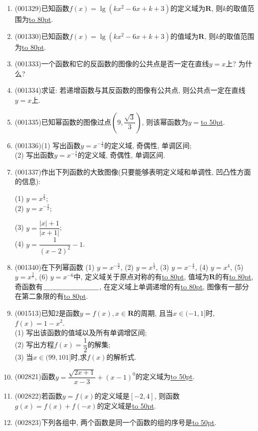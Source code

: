 \documentclass[10pt,a4paper]{article}
\newcommand{\blank}[1]{\underline{\hbox to #1pt{}}}
\begin{document}
\begin{enumerate}[1.]
\item {\tiny (001329)}已知函数$f(x)=\lg(kx^2-6x+k+3)$的定义域为$\mathbf{R}$, 则$k$的取值范围为\blank{80}.
\item {\tiny (001330)}已知函数$f(x)=\lg(kx^2-6x+k+3)$的值域为$\mathbf{R}$, 则$k$的取值范围为\blank{80}.
\item {\tiny (001333)}一个函数和它的反函数的图像的公共点是否一定在直线$y=x$上? 为什么?
\item {\tiny (001334)}求证: 若递增函数与其反函数的图像有公共点, 则公共点一定在直线$y=x$上.
\item {\tiny (001335)}已知幂函数的图像过点$(9,\dfrac{\sqrt{3}}{3})$, 则该幂函数为$y=$\blank{50}.
\item {\tiny (001336)}(1) 写出函数$y=x^{-\frac{4}{3}}$的定义域, 奇偶性, 单调区间;\\ 
(2) 写出函数$y=x^{-\frac{3}{4}}$的定义域, 奇偶性, 单调区间.
\item {\tiny (001337)}作出下列函数的大致图像(只要能够表明定义域和单调性, 凹凸性方面的信息):\\ 
\begin{multicols}{2}
(1) $y=x^{\frac{2}{3}}$; \\ 
(2) $y=x^{-\frac{3}{2}}$; \\ 
\end{multicols}
\begin{multicols}{2}
(3) $y=\dfrac{|x|+1}{|x+1|}$;  \\ 
(4) $y=\dfrac{1}{(x-2)^2}-1$.
\end{multicols}
\item {\tiny (001340)}在下列幂函数 (1) $y=x^{-\frac{3}{2}}$, (2) $y=x^{\frac{5}{4}}$, (3) $y=x^{-\frac{4}{3}}$, (4) $y=x^4$, (5) $y=x^{\frac{3}{7}}$, (6) $y=x^{-6}$中, 定义域关于原点对称的有\blank{80}, 值域为$\mathbf{R}$的有\blank{80}, 奇函数有$\blank{80}$, 在定义域上单调递增的有\blank{80}, 图像有一部分在第二象限的有\blank{80}.
\item {\tiny (001513)}已知$2$是函数$y=f(x),x\in\mathbf{R}$的周期, 且当$x\in(-1,1]$时, $f(x)=1-x^2$.\\ 
(1) 写出该函数的值域以及所有单调增区间;\\ 
(2) 写出方程$f(x)=\dfrac{1}{2}$的解集;\\ 
(3) 当$x\in(99,101]$时,求$f(x)$的解析式.
\item {\tiny (002821)}函数$y=\dfrac{\sqrt{2x+1}}{x-3}+(x-1)^0$的定义域为\blank{50}.
\item {\tiny (002822)}若函数$y=f(x)$的定义域是$[-2,4]$, 则函数$g(x)=f(x)+f(-x)$的定义域是\blank{50}.
\item {\tiny (002823)}下列各组中, 两个函数是同一个函数的组的序号是\blank{50}.\\

\end{enumerate}
\end{document}
